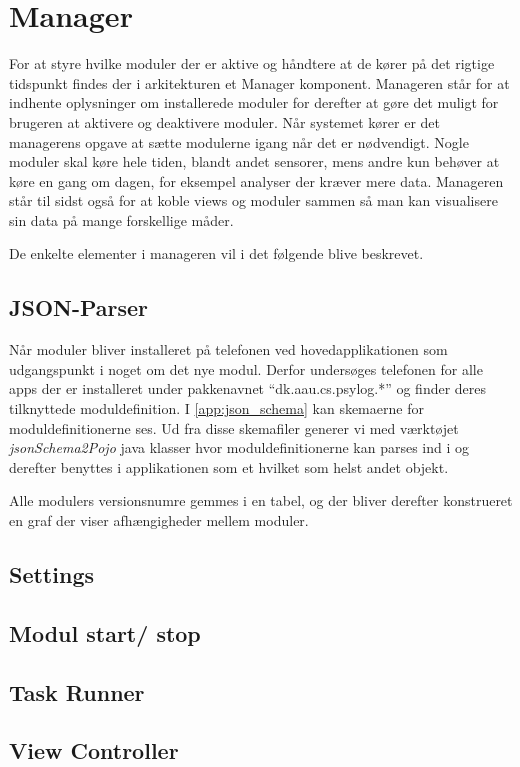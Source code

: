 \section{Manager}

For at styre hvilke moduler der er aktive og håndtere at de kører på det rigtige tidspunkt findes der i arkitekturen et Manager komponent.
Manageren står for at indhente oplysninger om installerede moduler for derefter at gøre det muligt for brugeren at aktivere og deaktivere moduler.
Når systemet kører er det managerens opgave at sætte modulerne igang når det er nødvendigt.
Nogle moduler skal køre hele tiden, blandt andet sensorer, mens andre kun behøver at køre en gang om dagen, for eksempel analyser der kræver mere data.
Manageren står til sidst også for at koble views og moduler sammen så man kan visualisere sin data på mange forskellige måder.

De enkelte elementer i manageren vil i det følgende blive beskrevet.

\subsection{JSON-Parser}

Når moduler bliver installeret på telefonen ved hovedapplikationen som udgangspunkt i noget om det nye modul.
Derfor undersøges telefonen for alle apps der er installeret under pakkenavnet ``dk.aau.cs.psylog.*'' og finder deres tilknyttede moduldefinition.
I \cref{app:json_schema} kan skemaerne for moduldefinitionerne ses.
Ud fra disse skemafiler generer vi med værktøjet \textit{jsonSchema2Pojo} \cite{jsonpojo} java klasser hvor moduldefinitionerne kan parses ind i og derefter benyttes i applikationen som et hvilket som helst andet objekt.


Alle modulers versionsnumre gemmes i en tabel, og der bliver derefter konstrueret en graf der viser afhængigheder mellem moduler.

\subsection{Settings}


\subsection{Modul start/ stop}

\subsection{Task Runner}

\subsection{View Controller}
